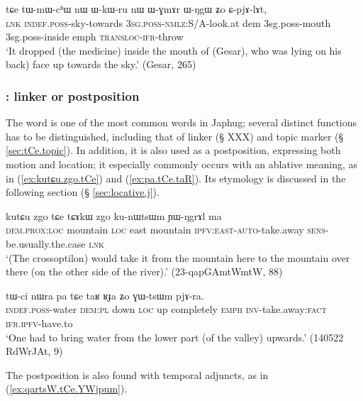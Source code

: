 \begin{exe}
\ex \label{ex:tWmWchW} 
\gll tɕe tɯ-mɯ-cʰɯ nɯ ɯ-kɯ-ru nɯ ɯ-ɣmɤr ɯ-ŋgɯ ʑo ɕ-pjɤ-lɤt, \\
\textsc{lnk} \textsc{indef}.\textsc{poss}-sky-towards \textsc{3sg}.\textsc{poss}-\textsc{nmlz}:S/A-look.at dem 3sg.poss-mouth 3sg.poss-inside emph \textsc{transloc}-\textsc{ifr}-throw \\
\glt `It dropped (the medicine) inside the mouth of (Gesar), who was lying on his back) face up towards the sky.' (Gesar, 265)
\end{exe}

\subsubsection{: linker or postposition} \label{sec:tCe.postposition}
The word  is one of the most common words in Japhug; several distinct functions has to be distinguished, including that of linker (§ XXX) and topic marker (§ \ref{sec:tCe.topic}). In addition, it is also used as a postposition, expressing both motion and location; it especially commonly occurs with an ablative meaning, as in (\ref{ex:kutɕu.zgo.tCe}) and (\ref{ex:pa.tCe.taR}). Its etymology is discussed in the following section (§ \ref{sec:locative.j}).

\begin{exe}
\ex \label{ex:kutɕu.zgo.tCe}
\gll kutɕu zgo tɕe tɕɤkɯ zgo ku-nɯtsɯm ɲɯ-ŋgrɤl ma \\
\textsc{dem}.\textsc{prox}:\textsc{loc} mountain \textsc{loc} east mountain \textsc{ipfv}:\textsc{east}-\textsc{auto}-take.away \textsc{sens}-be.usually.the.case \textsc{lnk} \\
\glt `(The crossoptilon) would take it from the mountain here to the mountain over there (on the other side of the river).' (23-qapGAmtWmtW, 88)
\end{exe}

\begin{exe}
\ex \label{ex:pa.tCe.taR}
\gll tɯ-ci nɯra pa tɕe taʁ ʁɟa ʑo ɣɯ-tsɯm pjɤ-ra. \\
\textsc{indef}.\textsc{poss}-water \textsc{dem}:\textsc{pl} down \textsc{loc} up completely \textsc{emph} \textsc{inv}-take.away:\textsc{fact} \textsc{ifr}.\textsc{ipfv}-have.to \\
\glt `One had to bring water from the lower part (of the valley) upwards.' (140522 RdWrJAt, 9)
\end{exe}

The postposition  is also found with temporal adjuncts, as in (\ref{ex:qartsW.tCe.YWjpum}).

